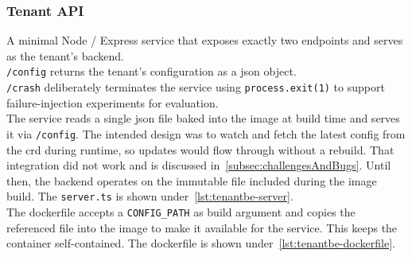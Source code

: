 \documentclass[11pt, a4paper, oneside, listof=totoc]{scrartcl}
\begin{document}
            \subsubsection{Tenant API}\label{subsubsec:tenantAPI}
                A minimal Node / Express service that exposes exactly two endpoints and serves as
                the tenant's backend.\\
                \texttt{/config} returns the tenant's configuration as a \gls{json} object.\\
                \texttt{/crash} deliberately terminates the service using
                \texttt{process.exit(1)} to support failure-injection experiments for evaluation.\\%
                The service reads a single \gls{json} file baked into the image at build time and
                serves it via \texttt{/config}.
                The intended design was to watch and fetch the latest config from the \gls{crd}
                during runtime, so updates would flow through without a rebuild.
                That integration did not work and is discussed in~\autoref{subsec:challengesAndBugs}.
                Until then, the backend operates on the immutable file included during the image
                build.
                The \texttt{server.ts} is shown under~\autoref{lst:tenantbe-server}.\\
                The dockerfile accepts a \texttt{CONFIG\_PATH} as build argument and copies the
                referenced file into the image to make it available for the service.
                This keeps the container self-contained.
                The dockerfile is shown under~\autoref{lst:tenantbe-dockerfile}.
\end{document}
